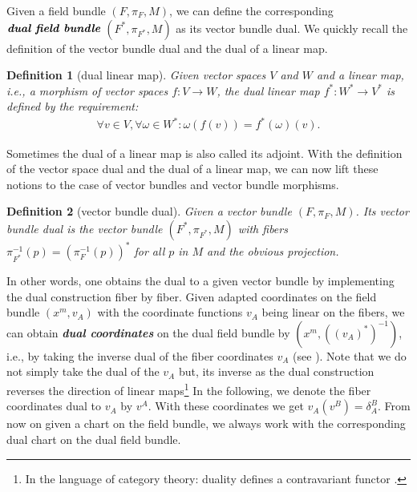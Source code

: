 \documentclass[a4paper,12pt, DIV=14, BCOR=5mm, twoside, headsepline, numbers=noenddot]{scrbook}
\newtheorem{definition}{Definition}[section]
\begin{document}
Given a field bundle $(F, \pi_F, M)$, we can define the corresponding $\textit{\textbf{dual field bundle}}$ $(F^{\ast}, \pi_{F^{\ast}},M)$ as its vector bundle dual. We quickly recall the definition of the vector bundle dual and the dual of a linear map.
\begin{definition}[dual linear map] \label{dual}
Given vector spaces $V$ and $W$ and a linear map, i.e., a morphism of vector spaces $f : V \rightarrow W$, the dual linear map $f^{\ast} : W^{\ast} \rightarrow V^{\ast}$ is defined by the requirement: 
\begin{align}
    \forall v \in V, \forall \omega \in W^{\ast} : \omega (f(v)) = f^{\ast}(\omega) (v).
\end{align}
\end{definition}
Sometimes the dual of a linear map is also called its adjoint. With the definition of the vector space dual and the dual of a linear map, we can now lift these notions to the case of vector bundles and vector bundle morphisms.
\begin{definition} [vector bundle dual]
Given a vector bundle $(F, \pi_F,M)$. Its vector bundle dual is the vector bundle $(F^{\ast}, \pi_{F^{\ast}},M)$ with fibers $\pi_{F^{\ast}}^{-1}(p) = (\pi_F^{-1}(p))^{\ast} $ for all $p$ in $M$ and the obvious projection.  
\end{definition}

In other words, one obtains the dual to a given vector bundle by implementing the dual construction fiber by fiber.
Given adapted coordinates on the field bundle $(x^m, v_A)$ with the coordinate functions $v_A$ being linear on the fibers, we can obtain \textbf{\textit{dual coordinates}} on the dual field bundle by $(x^m, ((v_A)^{\ast})^{-1})$, i.e., by taking the inverse dual of the fiber coordinates $v_A$ (see \cite{saunders_1989}). Note that we do not simply take the dual of the $v_A$ but, its inverse as the dual construction reverses the direction of linear maps\footnote{In the language of category theory: duality defines a contravariant functor \cite{MacLane:205493}.} In the following, we denote the fiber coordinates dual to $v_A$ by $v^A$. With these coordinates we get $ v_A(v^B) = \delta_A^B$. From now on given a chart on the field bundle, we always work with the corresponding dual chart on the dual field bundle.
\end{document}
